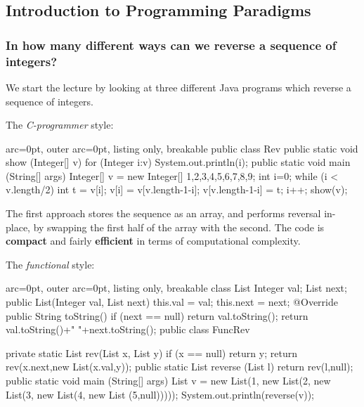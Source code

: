 \subsection*{ Introduction to Programming Paradigms }

\subsubsection*{ In how many different ways can we reverse a sequence of integers? }

We start the lecture by looking at three different Java programs which reverse a sequence of integers.

The \textit{C-programmer} style:

\begin{tcblisting}{ arc=0pt, outer arc=0pt, listing only, breakable}
public class Rev {
	public static void show (Integer[] v){
		for (Integer i:v)
			System.out.println(i);
	}
	public static void main (String[] args) {
		Integer[] v = new Integer[] {1,2,3,4,5,6,7,8,9};
		int i=0;
		while (i < v.length/2){
			int t = v[i];
			v[i] = v[v.length-1-i];
			v[v.length-1-i] = t;
			i++;
		} 
		show(v);
	}
}

\end{tcblisting}


The first approach stores the sequence as an array, and performs reversal in-place, by swapping the first half of the array with the second. The code is \textbf{compact} and fairly \textbf{efficient} in terms of computational complexity. 

The \textit{functional} style:

\begin{tcblisting}{ arc=0pt, outer arc=0pt, listing only, breakable}
class List {
	Integer val;
	List next;
	public List(Integer val, List next){
		this.val = val;
		this.next = next;
	}
	@Override
	public String toString(){
		if (next == null)
			return val.toString();
		return val.toString()+" "+next.toString();
	}
}
public class FuncRev {

	private static List rev(List x, List y){
		if (x == null)
			return y;
		return rev(x.next,new List(x.val,y));
	}
	public static List reverse (List l){
		return rev(l,null);
	}
	public static void main (String[] args) {
		List v = new List(1, new List(2, new List(3, new List(4, new List (5,null)))));
		System.out.println(reverse(v));
	}
}

\end{tcblisting}


